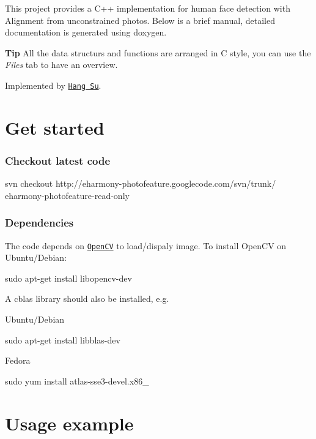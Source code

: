 

This project provides a C++ implementation for human face detection with Alignment from unconstrained photos. Below is a brief manual, detailed documentation is generated using doxygen. \par
 {\bfseries Tip} All the data structurs and functions are arranged in C style, you can use the {\itshape Files} tab to have an overview. \par
\par
 Implemented by \href{http://cs.umass.edu/~hsu}{\tt Hang Su}.

    \section*{Get started}

 \subsubsection*{Checkout latest code}

 svn checkout http\-://eharmony-\/photofeature.\-googlecode.\-com/svn/trunk/ eharmony-\/photofeature-\/read-\/only \subsubsection*{Dependencies}

 

The code depends on \href{http://opencv.willowgarage.com/}{\tt Open\-C\-V} to load/dispaly image. To install Open\-C\-V on Ubuntu/\-Debian\-: 

 sudo apt-\/get install libopencv-\/dev 

A cblas library should also be installed, e.\-g. \par
 Ubuntu/\-Debian 



sudo apt-\/get install libblas-\/dev

 Fedora 

 sudo yum install atlas-\/sse3-\/devel.\-x86\-\_\section*{Usage example}

